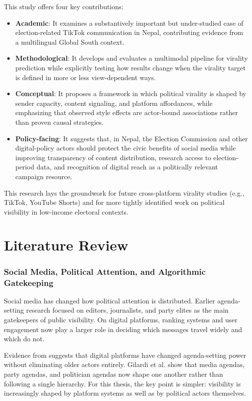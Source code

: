 \documentclass[12pt,a4paper]{report}
\begin{document}
This study offers four key contributions:
\begin{itemize}
    \item \textbf{Academic}: It examines a substantively important but under-studied case of election-related TikTok communication in Nepal, contributing evidence from a multilingual Global South context.
    \item \textbf{Methodological}: It develops and evaluates a multimodal pipeline for virality prediction while explicitly testing how results change when the virality target is defined in more or less view-dependent ways.
\newpage
    \item \textbf{Conceptual}: It proposes a framework in which political virality is shaped by sender capacity, content signaling, and platform affordances, while emphasizing that observed style effects are actor-bound associations rather than proven causal strategies.
    \item \textbf{Policy-facing}: It suggests that, in Nepal, the Election Commission and other digital-policy actors should protect the civic benefits of social media while improving transparency of content distribution, research access to election-period data, and recognition of digital reach as a politically relevant campaign resource.
\end{itemize}

This research lays the groundwork for future cross-platform virality studies (e.g., TikTok, YouTube Shorts) and for more tightly identified work on political visibility in low-income electoral contexts.
\newpage

\chapter{Literature Review}
\subsection{Social Media, Political Attention, and Algorithmic Gatekeeping}

Social media has changed how political attention is distributed. Earlier agenda-setting research focused on editors, journalists, and party elites as the main gatekeepers of public visibility. On digital platforms, ranking systems and user engagement now play a larger role in deciding which messages travel widely and which do not.

Evidence from \parencite{Gilardi02012022} suggests that digital platforms have changed agenda-setting power without eliminating older actors entirely. Gilardi et al. show that media agendas, party agendas, and politician agendas now shape one another rather than following a single hierarchy. For this thesis, the key point is simpler: visibility is increasingly shaped by platform systems as well as by political actors themselves.
\end{document}
